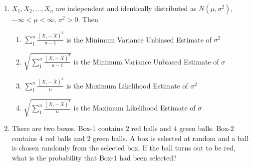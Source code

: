 \renewcommand{\theequation}{\theenumi}
\renewcommand{\thefigure}{\theenumi}
\renewcommand{\thetable}{\theenumi}
\begin{enumerate}[label=\thesection.\arabic*.,ref=\thesection.\theenumi]

\item $X_1,X_2,\ldots,X_n$ are independent and identically
distributed as $N(\mu, \sigma^2)$, $-\infty < \mu < \infty$, $\sigma^2 > 0$. Then
\begin{enumerate}
    \item $\sum_1^n\frac{(X_i-\bar{X})^2}{n-1}$ is the Minimum Variance Unbiased Estimate of $\sigma^2$\\
    \item $\sqrt{\sum_1^n\frac{(X_i-\bar{X})^2}{n-1}}$ is the Minimum Variance Unbiased Estimate of $\sigma$\\
    \item $\sum_1^n\frac{(X_i-\bar{X})^2}{n}$ is the Maximum Likelihood Estimate of $\sigma^2$\\
    \item $\sqrt{\sum_1^n\frac{(X_i-\bar{X})^2}{n}}$ is the Maximum Likelihood \qquad Estimate of $\sigma$
\end{enumerate}
%
\solution

%
\item There are two boxes. Box-$1$ contains $2$ red balls and $4$ green balls. Box-$2$ contains $4$ red balls and $2$ green balls. A box is selected at random and a ball is chosen randomly from the selected box. If the ball turns out to be red, what is the probability that Box-$1$ had been selected?
%
\solution




\end{enumerate}
